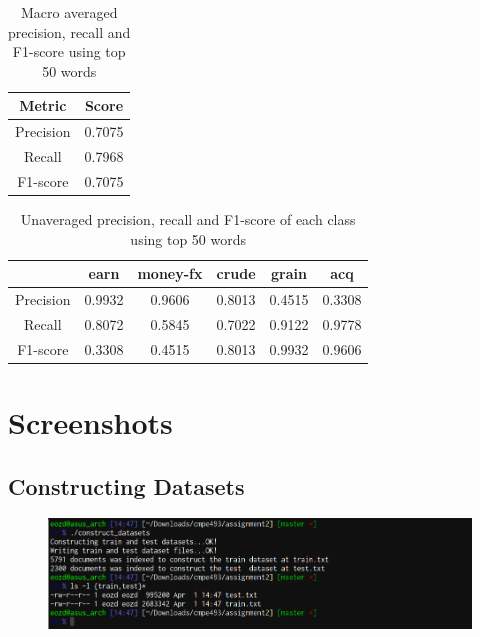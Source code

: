 \documentclass{article}
\begin{document}
\begin{table}[H]
	\caption{Macro averaged precision, recall and F1-score using top 50 words}
	\centering
	\begin{tabular}{|c|c|}
		\hline
		Metric & Score \\
		\hline
		Precision & 0.7075 \\
		\hline
		Recall & 0.7968 \\
		\hline
		F1-score & 0.7075 \\
		\hline
	\end{tabular}
\end{table}

\begin{table}[H]
	\caption{Unaveraged precision, recall and F1-score of each class using top 50 words}
	\centering
	\begin{tabular}{|c|c|c|c|c|c|}
		\hline
		& earn & money-fx & crude & grain & acq \\
		\hline
		Precision & 0.9932 & 0.9606 & 0.8013 & 0.4515 & 0.3308 \\
		\hline
		Recall & 0.8072 & 0.5845 & 0.7022 & 0.9122 & 0.9778 \\
		\hline
		F1-score & 0.3308 & 0.4515 & 0.8013 & 0.9932 & 0.9606 \\
		\hline
	\end{tabular}
\end{table}

\section{Screenshots}

\subsection{Constructing Datasets}
\begin{figure}[H]
	\centering
	\includegraphics[width=\textwidth]{construct.png}
\end{figure}
\end{document}
